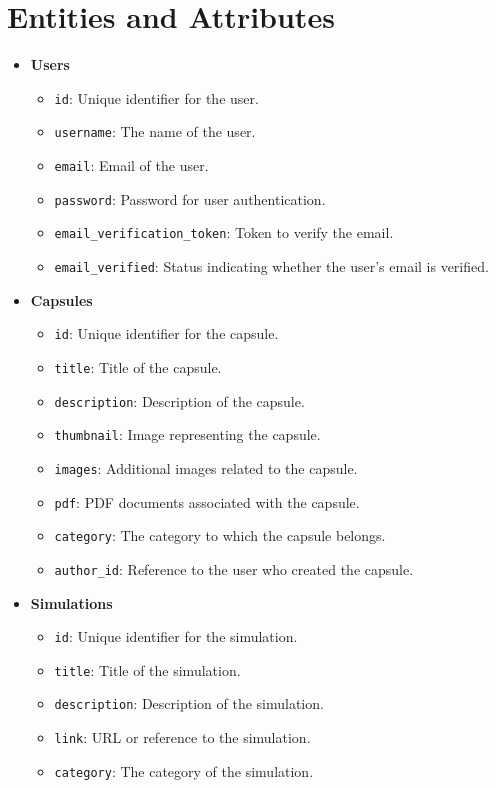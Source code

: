 \section*{Entities and Attributes}
\begin{itemize}
    \item \textbf{Users}
    \begin{itemize}
        \item \texttt{id}: Unique identifier for the user.
        \item \texttt{username}: The name of the user.
        \item \texttt{email}: Email of the user.
        \item \texttt{password}: Password for user authentication.
        \item \texttt{email\_verification\_token}: Token to verify the email.
        \item \texttt{email\_verified}: Status indicating whether the user's email is verified.
    \end{itemize}
    
    \item \textbf{Capsules}
    \begin{itemize}
        \item \texttt{id}: Unique identifier for the capsule.
        \item \texttt{title}: Title of the capsule.
        \item \texttt{description}: Description of the capsule.
        \item \texttt{thumbnail}: Image representing the capsule.
        \item \texttt{images}: Additional images related to the capsule.
        \item \texttt{pdf}: PDF documents associated with the capsule.
        \item \texttt{category}: The category to which the capsule belongs.
        \item \texttt{author\_id}: Reference to the user who created the capsule.
    \end{itemize}
    
    \item \textbf{Simulations}
    \begin{itemize}
        \item \texttt{id}: Unique identifier for the simulation.
        \item \texttt{title}: Title of the simulation.
        \item \texttt{description}: Description of the simulation.
        \item \texttt{link}: URL or reference to the simulation.
        \item \texttt{category}: The category of the simulation.
    \end{itemize}
    

\end{itemize}
